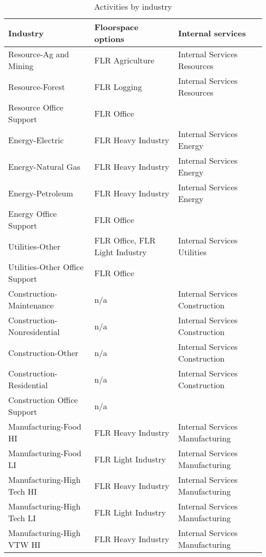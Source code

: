 \begin{table}
\centering
\caption{Activities by industry}\label{tab:activity-industry}
\fontsize{9.5}{10.5}\rm
\begin{tabular}{|l|l|l|}
\hline
Industry                        & Floorspace options & Internal services \\
\hline
Resource-Ag and Mining          & FLR Agriculture & Internal Services Resources \\
Resource-Forest                 & FLR Logging & Internal Services Resources \\
Resource Office Support         & FLR Office & \\
\hline 	
Energy-Electric                 & FLR Heavy Industry & Internal Services Energy \\
Energy-Natural Gas              & FLR Heavy Industry & Internal Services Energy \\
Energy-Petroleum                & FLR Heavy Industry & Internal Services Energy \\
Energy Office Support           & FLR Office &  \\
\hline
Utilities-Other                 & FLR Office, FLR Light Industry & Internal Services Utilities \\
Utilities-Other Office Support  & FLR Office &  \\
\hline
Construction-Maintenance        & n/a & Internal Services Construction \\
Construction-Nonresidential     & n/a & Internal Services Construction \\
Construction-Other              & n/a & Internal Services Construction \\
Construction-Residential        & n/a & Internal Services Construction \\
Construction Office Support     & n/a & \\
\hline
Manufacturing-Food HI           & FLR Heavy Industry & Internal Services Manufacturing \\
Manufacturing-Food LI           & FLR Light Industry & Internal Services Manufacturing \\
Manufacturing-High Tech HI      & FLR Heavy Industry & Internal Services Manufacturing \\
Manufacturing-High Tech LI      & FLR Light Industry & Internal Services Manufacturing \\
Manufacturing-High VTW HI       & FLR Heavy Industry & Internal Services Manufacturing \\

\end{tabular}
\end{table}
